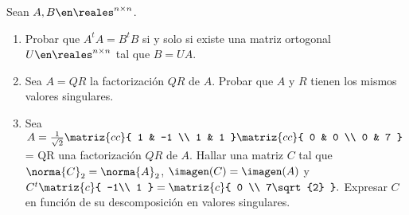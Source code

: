 \begin{enunciado}{\ejExtra}
  {\tiny{}} Sean $A, B \en \reales^{n \times n}$.
  \begin{enumerate}[label=(\alph*)]
    \item
          Probar que $A^t A = B^t B$ si y solo si existe una matriz ortogonal $U \en \reales^{n \times n}$ tal que
          $B = UA$.

    \item
          Sea $A = QR$ la factorización $QR$ de $A$. Probar que $A$ y $R$ tienen los mismos valores singulares.

    \item
          Sea $
            A = \frac{1}{\sqrt{2}}
            \matriz{cc}{
              1 & -1 \\
              1 & 1
            }
            \matriz{cc}{
              0 & 0 \\
              0 & 7
            }
          $ = QR una factorización $QR$ de $A$.
          Hallar una matriz $C$ tal que $\norma{C}_2 = \norma{A}_2$, $\imagen(C) = \imagen(A)$ y
          $C^t
            \matriz{c}{
              -1\\
              1
            } =
            \matriz{c}{
              0 \\
              7\sqrt{2}
            }.$
          Expresar $C$ en función de su descomposición en valores singulares.

  \end{enumerate}
\end{enunciado}

